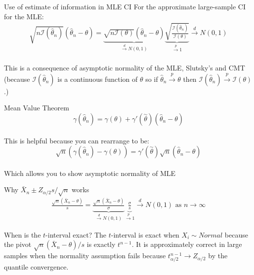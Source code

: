 \documentclass[avery5388,grid,frame]{flashcards}
\begin{document}
\begin{flashcard}[Proof]{Use of estimate of information in MLE CI}
\bigskip\bigskip 
For the approximate large-sample CI for the MLE:
{\begin{align*}
\sqrt{n\mathcal{I}(\hat{\theta}_n)}(\hat{\theta}_n-\theta)=\underbrace{\sqrt{n\mathcal{I}(\theta)}(\hat{\theta}_n-\theta)}_{\overset{d}{\rightarrow}N(0,1)}\underbrace{\sqrt{\frac{\mathcal{I}(\hat{\theta}_n)}{\mathcal{I}(\theta)}}}_{\overset{p}{\rightarrow}1}\overset{d}{\rightarrow}N(0,1) 
\end{align*}}
\bigskip\\This is a consequence of asymptotic normality of the MLE, Slutsky's and CMT (because $\mathcal{I}(\hat{\theta}_n)$ is a continuous function of $\theta$ so if $\hat{\theta}_n\overset{p}{\rightarrow}\theta$ then $\mathcal{I}(\hat{\theta}_n)\overset{p}{\rightarrow}\mathcal{I}(\theta)$.)
\end{flashcard}
\begin{flashcard}[Definition]{Mean Value Theorem}
\bigskip\bigskip\bigskip
\begin{equation*}
\gamma(\hat{\theta}_n)=\gamma(\theta)+\gamma'(\overset{\sim}{\theta})(\hat{\theta}_n-\theta)
\end{equation*}
\bigskip\\
This is helpful because you can rearrange to be:
\begin{equation*}
\sqrt{n}(\gamma(\hat{\theta}_n)-\gamma(\theta))=\gamma'(\overset{\sim}{\theta})\sqrt{n}(\hat{\theta}_n-\theta)
\end{equation*}
\bigskip\\Which allows you to show asymptotic normality of MLE
\end{flashcard}
\begin{flashcard}[Proofish]{Why $\bar{X}_n\pm Z_{\alpha/2}s/\sqrt{n}$ works}
\bigskip\bigskip\bigskip
{\begin{align*}
\frac{\sqrt{n}(\bar{X}_n-\theta)}{s}=\underbrace{\frac{\sqrt{n}(\bar{X}_n-\theta)}{\sigma}}_{\overset{d}{\rightarrow}N(0,1)}\underbrace{\frac{\sigma}{s}}_{\overset{p}{\rightarrow}1}\overset{d}{\rightarrow}N(0,1) \textrm{  as } n\rightarrow\infty
\end{align*}}
\end{flashcard}
\begin{flashcard}{When is the $t$-interval exact?}
\bigskip\bigskip\bigskip
The $t$-interval is exact when $X_i\sim Normal$ because the pivot $\sqrt{n}(\bar{X}_n-\theta)/s$ is exactly $t^{n-1}$. It is approximately correct in large samples when the normality assumption fails because $t_{\alpha/2}^{n-1}\rightarrow Z_{\alpha/2}$ by the quantile convergence.
\end{flashcard}
\end{document}
